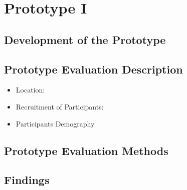 
\chapter{Prototype I} %

\label{contextualenqchapter} %


\section{Development of the Prototype}
\section{Prototype Evaluation Description}
\begin{itemize}
\item{Location}:
\item{Recruitment of Participants}:
\item{Participants Demography}
\end{itemize}
\section{Prototype Evaluation Methods}
\section{Findings}
\begin{flushright}
\end{flushright}
